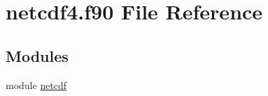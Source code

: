 \hypertarget{netcdf4_8f90}{}\section{netcdf4.\+f90 File Reference}
\label{netcdf4_8f90}
\subsection*{Modules}
\begin{DoxyCompactItemize}
\item 
module \hyperlink{namespacenetcdf}{netcdf}
\end{DoxyCompactItemize}
